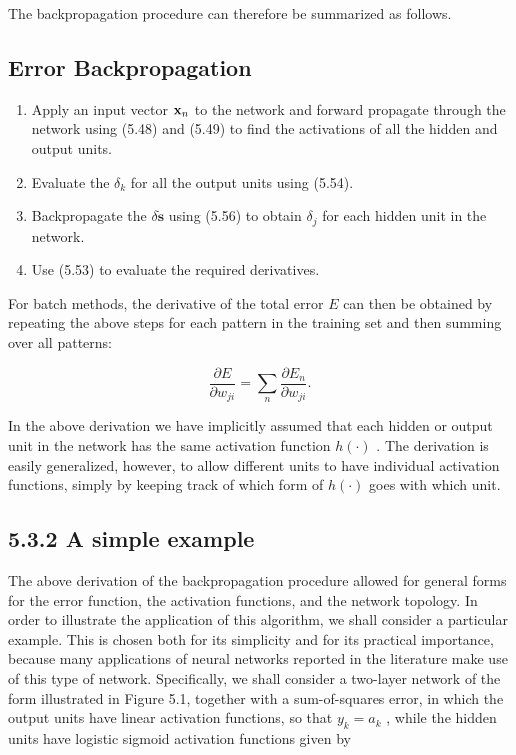 \documentclass[
  10
]{article}
\begin{document}
The backpropagation procedure can therefore be summarized as follows.

\subsection{Error Backpropagation}\label{error-backpropagation-1}

\begin{enumerate}
\def\labelenumi{\arabic{enumi}.}
\item
  Apply an input vector \({ \bf x } _ { n }\) to the network and forward
  propagate through the network using (5.48) and (5.49) to find the
  activations of all the hidden and output units.
\item
  Evaluate the \(\delta _ { k }\) for all the output units using (5.54).
\item
  Backpropagate the \(\delta \mathbf { \dot { s } }\) using (5.56) to
  obtain \(\delta _ { j }\) for each hidden unit in the network.
\item
  Use (5.53) to evaluate the required derivatives.
\end{enumerate}

For batch methods, the derivative of the total error \(E\) can then be
obtained by repeating the above steps for each pattern in the training
set and then summing over all patterns:

\[
\frac {\partial E}{\partial w _ {j i}} = \sum_ {n} \frac {\partial E _ {n}}{\partial w _ {j i}}.\tag{5.57}
\]

In the above derivation we have implicitly assumed that each hidden or
output unit in the network has the same activation function
\(h ( \cdot )\) . The derivation is easily generalized, however, to
allow different units to have individual activation functions, simply by
keeping track of which form of \(h ( \cdot )\) goes with which unit.

\subsection{5.3.2 A simple example}\label{a-simple-example}

The above derivation of the backpropagation procedure allowed for
general forms for the error function, the activation functions, and the
network topology. In order to illustrate the application of this
algorithm, we shall consider a particular example. This is chosen both
for its simplicity and for its practical importance, because many
applications of neural networks reported in the literature make use of
this type of network. Specifically, we shall consider a two-layer
network of the form illustrated in Figure 5.1, together with a
sum-of-squares error, in which the output units have linear activation
functions, so that \(y _ { k } = a _ { k }\) , while the hidden units
have logistic sigmoid activation functions given by
\end{document}
